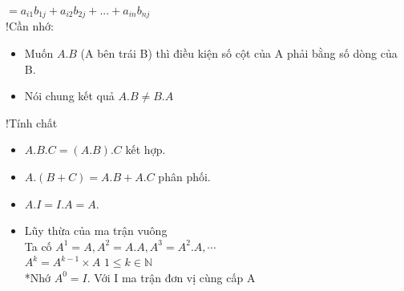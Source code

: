 \begin{enumerate}
	 	$=a_{i1}b_{1j} + a_{i2}b_{2j} +...+ a_{in}b_{nj}$ \\
	 	!Cần nhớ: \\
	 	\begin{itemize}
	 		\item Muốn $A.B$ (A bên trái B) thì điều kiện số cột của A phải bằng số dòng của B.
	 		\item Nói chung kết quả $A.B \neq B.A$
	 	\end{itemize}
	 	!Tính chất \\
	 	\begin{itemize}
	 		\item $A.B.C = (A.B).C $ kết hợp.
	 		\item $A.(B+C) = A.B + A.C $ phân phối.
	 		\item $A.I = I.A =A$.
	 		\item Lũy thừa của ma trận vuông \\
	 		Ta cố $A^1=A, A^2=A.A, A^3=A^2.A,\cdots$ \\
	 		$\boxed{A^k = A^{k-1} \times A}$ \hspace{.5cm} $1 \le k \in \mathbb{N}$ \\
	 		*Nhớ $A^0 = I$. Với I ma trận đơn vị cùng cấp A
	 		
	 	\end{itemize}
	 	
\end{enumerate}